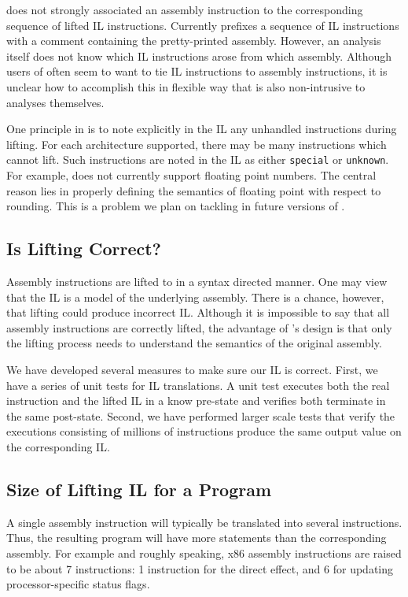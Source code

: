 \bap does not strongly associated an assembly instruction to the
corresponding sequence of lifted IL instructions.  Currently \bap
prefixes a sequence of IL instructions with a comment containing the
pretty-printed assembly.  However, an analysis itself does not know
which IL instructions arose from which assembly.  Although users of
\bap often seem to want to tie IL instructions to assembly
instructions, it is unclear how to accomplish this in flexible way
that is also non-intrusive to analyses themselves.

One principle in \bap is to  note explicitly in the IL any unhandled
instructions during lifting.  For each architecture supported, there
may be many instructions which \bap cannot lift.  Such instructions
are noted in the IL as either {\tt special} or {\tt unknown}. For
example, \bap does not currently support floating point numbers. The
central reason lies in properly defining the semantics of floating
point with respect to rounding.  This is a problem we plan on tackling
in future versions of \bap.

\subsection{Is Lifting Correct?}

Assembly instructions are lifted to \bap in a syntax directed manner.
One may view that the \bap IL is a model of the underlying assembly.
There is a chance, however, that lifting could produce incorrect
IL. Although it is impossible to say that all assembly instructions
are correctly lifted, the advantage of \bap's design is that only the
lifting process needs to understand the semantics of the original
assembly.


We have developed several measures to make sure our IL is
correct. First, we have a series of unit tests for IL translations. A
unit test executes both the real instruction and the lifted IL in a
know pre-state and verifies both terminate in the same post-state.
Second, we have performed larger scale tests that verify the
executions consisting of millions of instructions produce the same
output value on the corresponding IL.  


\subsection{Size of Lifting IL for a Program}

A single assembly instruction will typically be translated into
several \bap instructions. Thus, the resulting \bap program will
have more statements than the corresponding assembly.  For example and
roughly speaking, x86 assembly instructions are raised to be about 7
\bap instructions: 1 \bap instruction for the direct effect, and 6
for updating processor-specific status flags.

